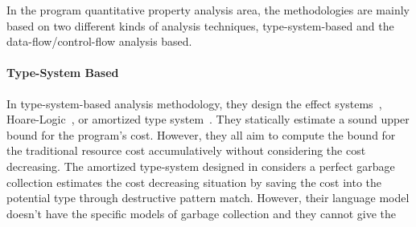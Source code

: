 {
 In the program quantitative property analysis area, the methodologies are mainly based on
 two different kinds of analysis techniques, type-system-based and the data-flow/control-flow analysis based.
\paragraph*{Type-System Based}
In type-system-based analysis methodology,
they design the effect systems~\cite{CicekBG0H17,RadicekBG0Z18,QuG019},
Hoare-Logic~\cite{GaboardiKOS21}, or amortized type system~\cite{RajaniG0021}.
They statically estimate a sound upper bound for the program's cost.
However, they all aim to compute the bound for the traditional resource cost accumulatively
without considering the cost decreasing. 
The amortized type-system designed in \cite{RajaniG0021} considers a perfect garbage collection
estimates the cost decreasing situation by saving the cost into the potential type through destructive pattern match.
However, their language model doesn't have the specific models of garbage collection and they cannot give the 
}
